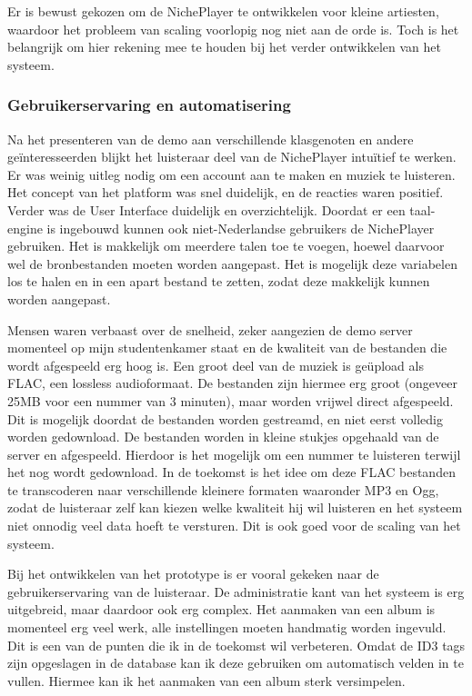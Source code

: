 Er is bewust gekozen om de NichePlayer te ontwikkelen voor kleine artiesten, waardoor het probleem van scaling voorlopig nog niet aan de orde is. Toch is het belangrijk om hier rekening mee te houden bij het verder ontwikkelen van het systeem.

\subsubsection*{Gebruikerservaring en automatisering}
Na het presenteren van de demo aan verschillende klasgenoten en andere geïnteresseerden blijkt het luisteraar deel van de NichePlayer intuïtief te werken. Er was weinig uitleg nodig om een account aan te maken en muziek te luisteren. Het concept van het platform was snel duidelijk, en de reacties waren positief. Verder was de User Interface duidelijk en overzichtelijk. Doordat er een taal-engine is ingebouwd kunnen ook niet-Nederlandse gebruikers de NichePlayer gebruiken. Het is makkelijk om meerdere talen toe te voegen, hoewel daarvoor wel de bronbestanden moeten worden aangepast. Het is mogelijk deze variabelen los te halen en in een apart bestand te zetten, zodat deze makkelijk kunnen worden aangepast.

Mensen waren verbaast over de snelheid, zeker aangezien de demo server momenteel op mijn studentenkamer staat en de kwaliteit van de bestanden die wordt afgespeeld erg hoog is. Een groot deel van de muziek is geüpload als FLAC, een lossless audioformaat. De bestanden zijn hiermee erg groot (ongeveer 25MB voor een nummer van 3 minuten), maar worden vrijwel direct afgespeeld. Dit is mogelijk doordat de bestanden worden gestreamd, en niet eerst volledig worden gedownload. De bestanden worden in kleine stukjes opgehaald van de server en afgespeeld. Hierdoor is het mogelijk om een nummer te luisteren terwijl het nog wordt gedownload. In de toekomst is het idee om deze FLAC bestanden te transcoderen naar verschillende kleinere formaten waaronder MP3 en Ogg, zodat de luisteraar zelf kan kiezen welke kwaliteit hij wil luisteren en het systeem niet onnodig veel data hoeft te versturen. Dit is ook goed voor de scaling van het systeem.

Bij het ontwikkelen van het prototype is er vooral gekeken naar de gebruikerservaring van de luisteraar. De administratie kant van het systeem is erg uitgebreid, maar daardoor ook erg complex. Het aanmaken van een album is momenteel erg veel werk, alle instellingen moeten handmatig worden ingevuld. Dit is een van de punten die ik in de toekomst wil verbeteren. Omdat de ID3 tags zijn opgeslagen in de database kan ik deze gebruiken om automatisch velden in te vullen. Hiermee kan ik het aanmaken van een album sterk versimpelen.

